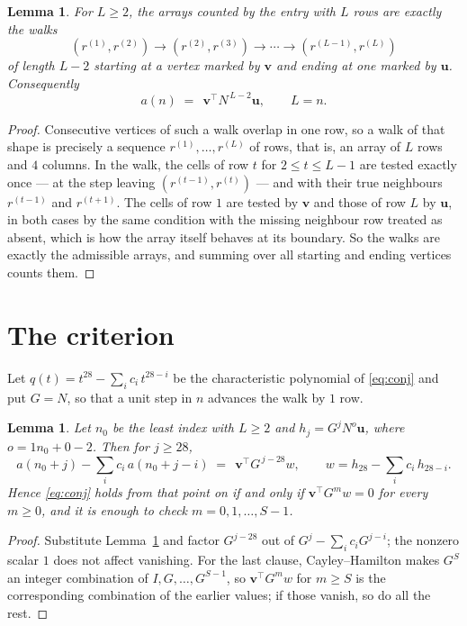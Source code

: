 \documentclass[11pt,a4paper]{article}
\theoremstyle{plain}
\newtheorem{lemma}[theorem]{Lemma}
\theoremstyle{definition}
\begin{document}
\begin{lemma}\label{lem:walk}
For $L\ge2$, the arrays counted by the entry with $L$ rows are exactly the walks
\[
(r^{(1)},r^{(2)})\to(r^{(2)},r^{(3)})\to\cdots\to(r^{(L-1)},r^{(L)})
\]
of length $L-2$ starting at a vertex marked by $\mathbf{v}$ and ending at one marked by
$\mathbf{u}$. Consequently
\[
a(n)\;=\;\,\mathbf{v}^{\!\top}N^{\,L-2}\mathbf{u},\qquad L=n .
\]
\end{lemma}

\begin{proof}
Consecutive vertices of such a walk overlap in one row, so a walk of that shape is
precisely a sequence $r^{(1)},\dots,r^{(L)}$ of rows, that is, an array of $L$ rows
and $4$ columns. In the walk, the cells of row $t$ for $2\le t\le L-1$ are tested
exactly once --- at the step leaving $(r^{(t-1)},r^{(t)})$ --- and with their true
neighbours $r^{(t-1)}$ and $r^{(t+1)}$. The cells of row $1$ are tested by
$\mathbf{v}$ and those of row $L$ by $\mathbf{u}$, in both cases by the same condition
with the missing neighbour row treated as absent, which is how the array itself behaves at
its boundary. So the walks are exactly the admissible arrays, and summing over all starting
and ending vertices counts them.
\end{proof}

\section{The criterion}

Let $q(t)=t^{28}-\sum_i c_i\,t^{28-i}$ be the characteristic polynomial of
\eqref{eq:conj} and put $G=N$, so that a unit step in $n$ advances the walk by
$1$ row.

\begin{lemma}\label{lem:crit}
Let $n_0$ be the least index with $L\ge2$ and $h_j=G^{j}N^{o}\mathbf{u}$, where
$o=1n_0+0-2$. Then for $j\ge28$,
\[
a(n_0+j)-\sum_i c_i\,a(n_0+j-i)\;=\;\,\mathbf{v}^{\!\top}G^{\,j-28}w,
\qquad w=h_{28}-\sum_i c_i\,h_{28-i} .
\]
Hence \eqref{eq:conj} holds from that point on if and only if
$\mathbf{v}^{\!\top}G^{m}w=0$ for every $m\ge0$, and it is enough to check
$m=0,1,\dots,S-1$.
\end{lemma}

\begin{proof}
Substitute Lemma~\ref{lem:walk} and factor $G^{j-28}$ out of
$G^{j}-\sum_ic_iG^{j-i}$; the nonzero scalar $1$ does not affect
vanishing. For the last clause, Cayley--Hamilton makes $G^{S}$ an integer combination of
$I,G,\dots,G^{S-1}$, so $\mathbf{v}^{\!\top}G^{m}w$ for $m\ge S$ is the corresponding
combination of the earlier values; if those vanish, so do all the rest.
\end{proof}
\end{document}
